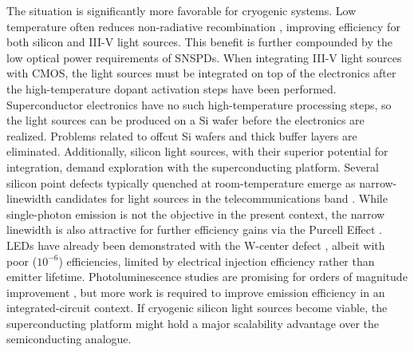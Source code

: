\documentclass[twocolumn]{article}
\begin{document}
The situation is significantly more favorable for cryogenic systems. Low temperature often reduces non-radiative recombination \cite{gurioli1991temperature, dolores2017waveguide, sa1958}, improving efficiency for both silicon and III-V light sources. This benefit is further compounded by the low optical power requirements of SNSPDs. When integrating III-V light sources with CMOS, the light sources must be integrated on top of the electronics after the high-temperature dopant activation steps have been performed. Superconductor electronics have no such high-temperature processing steps, so the light sources can be produced on a Si wafer before the electronics are realized. Problems related to offcut Si wafers and thick buffer layers are eliminated. Additionally, silicon light sources, with their superior potential for integration, demand exploration with the superconducting platform. Several silicon point defects typically quenched at room-temperature emerge as narrow-linewidth candidates for light sources in the telecommunications band \cite{davies1989optical,suku2014,buckley2017all,bere2018,chbe2018}. While single-photon emission \cite{hobe2020,redu2020,bech2020} is not the objective in the present context, the narrow linewidth is also attractive for further efficiency gains via the Purcell Effect \cite{romeira2018purcell}. LEDs have already been demonstrated with the W-center defect \cite{buckley2017all,bao2007point}, albeit with poor ($10^{-6}$) efficiencies, limited by electrical injection efficiency rather than emitter lifetime. Photoluminescence studies are promising for orders of magnitude improvement \cite{buckley2020optimization}, but more work is required to improve emission efficiency in an integrated-circuit context. If cryogenic silicon light sources become viable, the superconducting platform might hold a major scalability advantage over the semiconducting analogue. 
\end{document}
